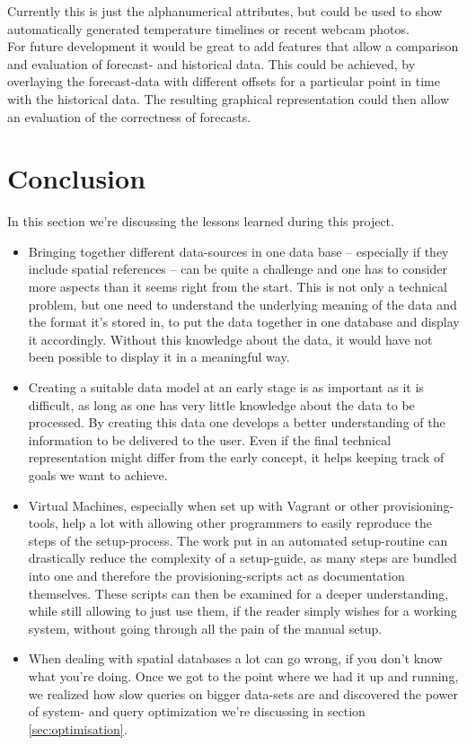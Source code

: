 \documentclass[paper=a4, fontsize=11pt]{article} %
\numberwithin{equation}{section} %
\numberwithin{figure}{section} %
\numberwithin{table}{section} %
\begin{document}
Currently this is just the alphanumerical attributes, but could be used to show automatically generated temperature timelines or recent webcam photos.\\
For future development it would be great to add features that allow a comparison and evaluation of forecast- and historical data. This could be achieved, by overlaying the forecast-data with different offsets for a particular point in time with the historical data. The resulting graphical representation could then allow an evaluation of the correctness of forecasts.


\newpage
\section{Conclusion}

In this section we're discussing the lessons learned during this project.
\begin{itemize}
\item Bringing together different data-sources in one data base -- especially if they include spatial references -- can be quite a challenge and one has to consider more aspects than it seems right from the start. This is not only a technical problem, but one need to understand the underlying meaning of the data and the format it's stored in, to put the data together in one database and display it accordingly. Without this knowledge about the data, it would have not been possible to display it in a meaningful way.
\item Creating a suitable data model at an early stage is as important as it is difficult, as long as one has very little knowledge about the data to be processed. By creating this data one develops a better understanding of the information to be delivered to the user. Even if the final technical representation might differ from the early concept, it helps keeping track of goals we want to achieve.
\item Virtual Machines, especially when set up with Vagrant or other provisioning-tools, help a lot with allowing other programmers to easily reproduce the steps of the setup-process. The work put in an automated setup-routine can drastically reduce the complexity of a setup-guide, as many steps are bundled into one and therefore the provisioning-scripts act as documentation themselves. These scripts can then be examined for a deeper understanding, while still allowing to just use them, if the reader simply wishes for a working system, without going through all the pain of the manual setup.
\item When dealing with spatial databases a lot can go wrong, if you don't know what you're doing. Once we got to the point where we had it up and running, we realized how slow queries on bigger data-sets are and discovered the power of system- and query optimization we're discussing in section \ref{sec:optimisation}.

\end{itemize}
\end{document}
